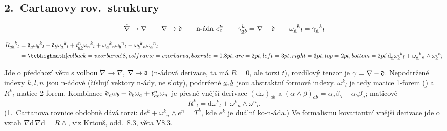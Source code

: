 \subsection*{2.\ Cartanovy rov.\ struktury}
\[
  \tilde\nabla\to\nabla \qquad \nabla\to\mathfrak{d} \qquad \text{n-áda } e^{\underline{n}}_{e} \qquad
  \gamma^{k}_{\underline{a}b} = \nabla - \mathfrak{d} \qquad
  \omega_{\underline{e}}{}^{k}{}_{l} = \gamma_{\underline{e}}{}^{k}{}_{l}
\]
\begin{veta}
\begin{align*}
  R_{\gmIjedenactAu{ab}}{}^{k}{}_{l}
  &= \gmIjedenactAd_{\gmIjedenactAu{a}}\omega_{\gmIjedenactAu{b}}{}^{k}{}_{l}
   - \gmIjedenactAd_{\gmIjedenactAu{b}}\omega_{\gmIjedenactAu{a}}{}^{k}{}_{l}
   + t^{n}_{\gmIjedenactAu{ab}}\omega_{n}{}^{k}{}_{l}
   + \omega_{\gmIjedenactAu{a}}{}^{k}{}_{n}\omega_{\gmIjedenactAu{b}}{}^{n}{}_{l}
   - \omega_{\gmIjedenactAu{b}}{}^{k}{}_{n}\omega_{\gmIjedenactAu{a}}{}^{n}{}_{l} \\
  &= \vzorec{\mathrm{d}_{\gmIjedenactAu{a}}\omega_{\gmIjedenactAu{b}}{}^{k}{}_{l} + \omega_{\gmIjedenactAu{a}}{}^{k}{}_{n}\wedge\omega_{\gmIjedenactAu{b}}{}^{n}{}_{l}}
\end{align*}
\end{veta}

\begin{vysvetleni}
Jde o předchozí větu s volbou $\tilde\nabla\to\nabla$, $\nabla\to\mathfrak{d}$ (n-ádová derivace, ta má $R=0$, ale torzi $t$), rozdílový tenzor je $\gamma=\nabla-\mathfrak{d}$. Nepodtržené indexy $k,l,n$ jsou n-ádové (číslují vektory n-ády, ne sloty), podtržené $\underline{a},\underline{b}$ jsou abstraktní formové indexy. $\omega^{k}{}_{l}$ je tedy matice 1-forem () a $R^{k}{}_{l}$ matice 2-forem. Kombinace $\mathfrak{d}_a\omega_b-\mathfrak{d}_b\omega_a+t^{n}_{ab}\omega_n$ je přesně vnější derivace $(\mathrm{d}\omega)_{ab}$ a $(\alpha\wedge\beta)_{ab}=\alpha_a\beta_b-\alpha_b\beta_a$; maticově
\[
  R^{k}{}_{l}=\mathrm{d}\omega^{k}{}_{l}+\omega^{k}{}_{n}\wedge\omega^{n}{}_{l}.
\]
(1.\ Cartanova rovnice obdobně dává torzi: $\mathrm{d}e^{k}+\omega^{k}{}_{n}\wedge e^{n}=T^{k}$, kde $e^{k}$ je duální ko-n-áda.) Ve formalismu kovariantní vnější derivace jde o vztah $\nabla\mathrm{d}\,\nabla\mathrm{d}=R\wedge$, viz Krtouš, odd.\ 8.3, věta V8.3.
\end{vysvetleni}

